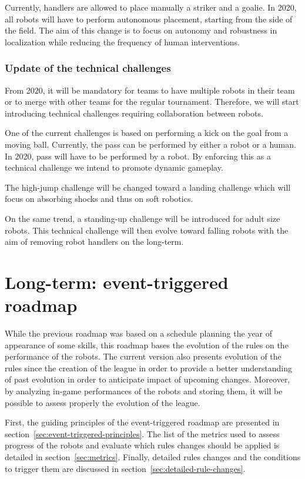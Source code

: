 \documentclass{article}
\begin{document}
Currently, handlers are allowed to place manually a striker and a goalie.
In 2020, all robots will have to perform autonomous placement,
starting from the side of the field.
The aim of this change is to focus on autonomy and robustness in localization
while reducing the frequency of human interventions.

\subsubsection{Update of the technical challenges}

From 2020, it will be mandatory for teams to have multiple robots in their team
or to merge with other teams for the regular tournament.
Therefore, we will start introducing technical challenges requiring collaboration between robots.

One of the current challenges is based on performing a kick on the goal from a moving ball.
Currently, the pass can be performed by either a robot or a human.
In 2020, pass will have to be performed by a robot.
By enforcing this as a technical challenge we intend to promote dynamic gameplay.

The high-jump challenge will be changed toward a landing challenge which will
focus on absorbing shocks and thus on soft robotics.

On the same trend, a standing-up challenge will be introduced for adult size robots.
This technical challenge will then evolve toward falling robots with the aim of removing
robot handlers on the long-term.


\section{\label{sec:LongTerm}Long-term: event-triggered roadmap}

While the previous roadmap was based on a schedule planning the year of
appearance of some skills,
this roadmap bases the evolution of the rules on the performance of the robots.
The current version also presents evolution of the rules since the creation of
the league in order to provide a better understanding of past evolution in order
to anticipate impact of upcoming changes.
Moreover, by analyzing in-game performances of the robots and storing them,
it will be possible to assess properly the evolution of the league.

First, the guiding principles of the event-triggered roadmap are presented in
section~\ref{sec:event-triggered-principles}.
The list of the metrics used to assess progress of the robots and evaluate which
rules changes should be applied is detailed in section~\ref{sec:metrics}.
Finally, detailed rules changes and the conditions to trigger them are discussed
in section~\ref{sec:detailed-rule-changes}.
\end{document}
